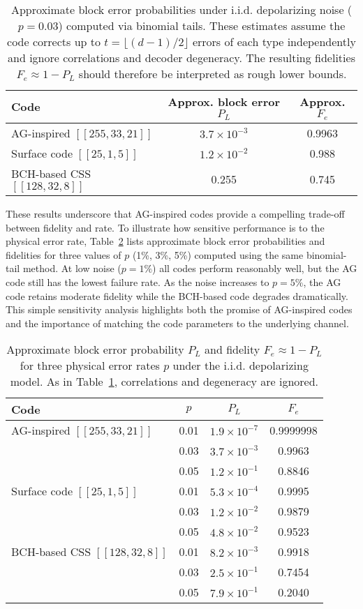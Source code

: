 \documentclass[conference]{IEEEtran}  %
\begin{document}
\begin{table}[t]
\centering
\caption{Approximate block error probabilities under i.i.d. depolarizing noise ($p=0.03$) computed via binomial tails.  These estimates assume the code corrects up to $t=\lfloor (d-1)/2\rfloor$ errors of each type independently and ignore correlations and decoder degeneracy.  The resulting fidelities $F_e\approx 1-P_L$ should therefore be interpreted as rough lower bounds.}
\label{tab:approx}
\begin{tabular}{lcc}
\hline
\textbf{Code} & \textbf{Approx. block error $P_L$} & \textbf{Approx. $F_e$} \\
\hline
AG-inspired $[[255,33,21]]$ & $3.7\times 10^{-3}$ & 0.9963 \\
Surface code $[[25,1,5]]$ & $1.2\times 10^{-2}$ & 0.988 \\
BCH-based CSS $[[128,32,8]]$ & 0.255 & 0.745 \\
\hline
\end{tabular}
\end{table}

These results underscore that AG-inspired codes provide a compelling trade-off between fidelity and rate.  To illustrate how sensitive performance is to the physical error rate, Table~\ref{tab:prange} lists approximate block error probabilities and fidelities for three values of $p$ (1\%, 3\%, 5\%) computed using the same binomial-tail method.  At low noise ($p=1\%$) all codes perform reasonably well, but the AG code still has the lowest failure rate.  As the noise increases to $p=5\%$, the AG code retains moderate fidelity while the BCH-based code degrades dramatically.  This simple sensitivity analysis highlights both the promise of AG-inspired codes and the importance of matching the code parameters to the underlying channel.

\begin{table}[t]
\centering
\caption{Approximate block error probability $P_L$ and fidelity $F_e\approx 1-P_L$ for three physical error rates $p$ under the i.i.d. depolarizing model.  As in Table~\ref{tab:approx}, correlations and degeneracy are ignored.}
\label{tab:prange}
\begin{tabular}{lccc}
\hline
\textbf{Code} & \textbf{$p$} & \textbf{$P_L$} & \textbf{$F_e$} \\
\hline
AG-inspired $[[255,33,21]]$ & 0.01 & $1.9\times 10^{-7}$ & 0.9999998 \\
 & 0.03 & $3.7\times 10^{-3}$ & 0.9963 \\
 & 0.05 & $1.2\times 10^{-1}$ & 0.8846 \\
Surface code $[[25,1,5]]$ & 0.01 & $5.3\times 10^{-4}$ & 0.9995 \\
 & 0.03 & $1.2\times 10^{-2}$ & 0.9879 \\
 & 0.05 & $4.8\times 10^{-2}$ & 0.9523 \\
BCH-based CSS $[[128,32,8]]$ & 0.01 & $8.2\times 10^{-3}$ & 0.9918 \\
 & 0.03 & $2.5\times 10^{-1}$ & 0.7454 \\
 & 0.05 & $7.9\times 10^{-1}$ & 0.2040 \\
\hline
\end{tabular}
\end{table}
\end{document}
